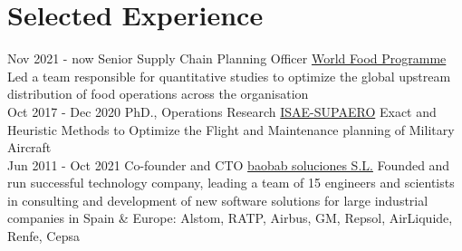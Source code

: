 \documentclass[letterpaper]{twentysecondcv} %
\begin{document}
\makeprofile %


\section{Selected Experience}

\begin{twenty} %
\twentyitem
      {Nov 2021 -}
    {now}
        {Senior Supply Chain Planning Officer}
        {\href{http://www.wfp.org/}{World Food Programme}}
        {}
        {Led a team responsible for quantitative studies to optimize the global upstream distribution of food operations across the organisation
        }
        \\
\twentyitem
    	{Oct 2017 -}
		{Dec 2020}
        {PhD., Operations Research}
        {\href{https://www.isae-supaero.fr/en/}{ISAE-SUPAERO}}
        {}
        {Exact and Heuristic Methods to Optimize the Flight and Maintenance planning of Military Aircraft
        }
        \\
	\twentyitem
    	{Jun 2011 -}
		{Oct 2021}
        {Co-founder and CTO}
        {\href{https://baobabsoluciones.es/en/}{baobab soluciones S.L.}}
        {}
        {Founded and run successful technology company, leading a team of 15 engineers and scientists in consulting and development of new software solutions for large industrial companies in Spain \& Europe: Alstom, RATP, Airbus, GM, Repsol, AirLiquide, Renfe, Cepsa
        }
\end{twenty}
\end{document}
